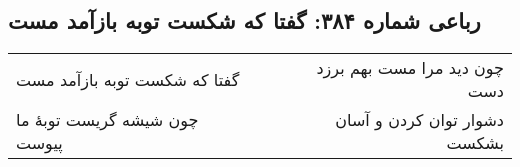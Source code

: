 \begin{center}
\section*{رباعی شماره ۳۸۴: گفتا که شکست توبه بازآمد مست}
\label{sec:0384}
\begin{longtable}{l p{0.5cm} r}
گفتا که شکست توبه بازآمد مست
&&
چون دید مرا مست بهم برزد دست
\\
چون شیشه گریست توبهٔ ما پیوست
&&
دشوار توان کردن و آسان بشکست
\\
\end{longtable}
\end{center}
